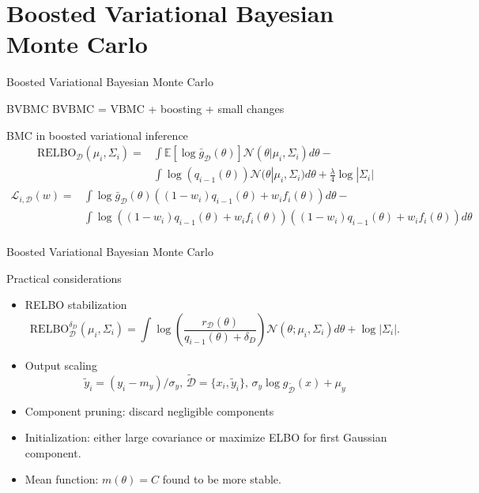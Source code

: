 \documentclass[pdf]{beamer}
\def \Ev {{\mathbb E}}
\def \gu {{\bar{g}}}
\begin{document}
\section{Boosted Variational Bayesian Monte Carlo}
\begin{frame}{Boosted Variational Bayesian Monte Carlo}
\begin{block}{BVBMC}
BVBMC = VBMC + boosting + small changes
\end{block}
\begin{block}{BMC in boosted variational inference}
\begin{equation*}
\begin{split}
\text{RELBO}_\mathcal{D}(\mu_i,\Sigma_i) = & \int \Ev[\log \gu_\mathcal{D}(\theta)] \mathcal{N}(\theta|\mu_i,\Sigma_i) d\theta - \\ &\int \log(q_{i-1}(\theta)) \mathcal{N}(\theta|\mu_i,\Sigma_i) d\theta
+ \frac{\lambda}{4} \log |\Sigma_i|
\end{split}
\end{equation*}
\begin{equation*}
\begin{split}
\mathcal{L}_{i,\mathcal{D}}(w) = & \int \log \gu_\mathcal{D}(\theta)
((1-w_{i}) q_{i-1}(\theta) + w_{i} f_{i}(\theta)) d\theta - \\
& \int \log ((1-w_{i}) q_{i-1}(\theta) + w_{i} f_{i}(\theta)) ((1-w_{i}) q_{i-1}(\theta) + w_{i} f_{i}(\theta)) d\theta \\
\end{split}
\end{equation*}
\end{block}
\end{frame}

\begin{frame}{Boosted Variational Bayesian Monte Carlo}
\begin{block}{Practical considerations}
\begin{itemize}
	\item RELBO stabilization
	\begin{equation*}
	\text{RELBO}^{\delta_D}_\mathcal{D}(\mu_i,\Sigma_i) = \int \log \left(\frac{r_\mathcal{D}(\theta)}{q_{i-1}(\theta)+\delta_D} \right) \mathcal{N}(\theta;\mu_i,\Sigma_i) d \theta + \log |\Sigma_i|.
	\end{equation*}
	\item Output scaling
	\begin{equation*}
	\tilde{y}_i = (y_i-m_y)/\sigma_y, \, \tilde{\mathcal{D}} = \{x_i,\tilde{y}_i\}, \,\sigma_y \log g_\mathcal{\tilde{D}}(x) + \mu_y
	\end{equation*}
	\item Component pruning: discard negligible components
	\item Initialization: either large covariance or maximize ELBO for first Gaussian component.
	\item Mean function: $m(\theta) = C$ found to be more stable.
\end{itemize}

\end{block}

\end{frame}
\end{document}
